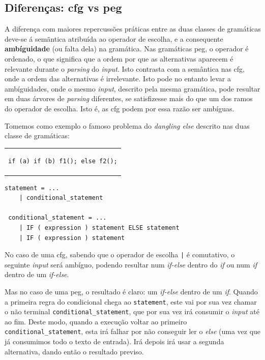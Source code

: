 \documentclass[
  oneside,
  11pt, a4paper,
  footinclude=true,
  headinclude=true,
  cleardoublepage=empty
]{scrbook}
\begin{document}
\subsection{Diferenças: \acrshort{cfg} vs \acrshort{peg}}

A diferença com maiores repercussões práticas entre as duas classes de gramáticas deve-se á semãntica atribuída ao operador de escolha, e a consequente \textbf{ambíguidade} (ou falta dela) na gramática. Nas gramáticas \acrshort{peg}, o operador é ordenado, o que significa que a ordem por que as alternativas aparecem é relevante durante o \textit{parsing} do \textit{input}. Isto contrasta com a semântica nas \acrshort{cfg}, onde a ordem das alternativas é irrelevante. Isto pode no entanto levar a ambíguidades, onde o mesmo \textit{input}, descrito pela mesma gramática, pode resultar em duas árvores de \textit{parsing} diferentes, se satisfizesse mais do que um dos ramos do operador de escolha. Isto é, as \acrshort{cfg} podem por essa razão ser ambíguas.

Tomemos como exemplo o famoso problema do \textit{dangling else}\cite{dangling-else} descrito nas duas classe de gramáticas:
\begin{center}
\begin{tabular}{c}
\begin{lstlisting}[backgroundcolor=\color{transparent}]
 if (a) if (b) f1(); else f2();
\end{lstlisting}
\end{tabular}
\end{center}

\begin{lstlisting}[caption=Gramática,captionpos=t]
 statement = ...
    | conditional_statement
 
 conditional_statement = ...
    | IF ( expression ) statement ELSE statement
    | IF ( expression ) statement
\end{lstlisting}

No caso de uma \acrshort{cfg}, sabendo que o operador de escolha \texttt{|} é comutativo, o seguinte \textit{input} será ambíguo, podendo resultar num \textit{if-else} dentro do \textit{if} ou num \textit{if} dentro de um \textit{if-else}.

Mas no caso de uma \acrshort{peg}, o resultado é claro: um \textit{if-else} dentro de um \textit{if}. Quando a primeira regra do condicional chega ao \texttt{statement}, este vai por sua vez chamar o não terminal \texttt{conditional\_statement}, que por sua vez irá consumir o \textit{input} até ao fim. Deste modo, quando a execução voltar ao primeiro \texttt{conditional\_statement}, esta irá falhar por não conseguir ler o \textit{else} (uma vez que já consumimos todo o texto de entrada). Irá depois irá usar a segunda alternativa, dando então o resultado previso.
\end{document}
